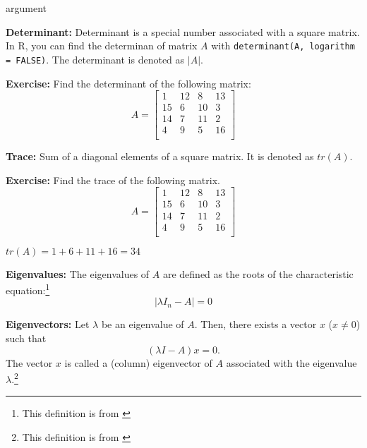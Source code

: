 \begin{labeling}{argument}
    \item[\textbf{Determinant:}] Determinant is a special number associated with a square matrix. In R, you can find the determinan of matrix $A$ with \verb|determinant(A, logarithm = FALSE)|. The determinant is denoted as $|A|$.

    \textbf{Exercise:} Find the determinant of the following matrix:
    \[
        A = \begin{bmatrix}
            1  & 12 & 8  & 13 \\
            15 & 6  & 10 & 3  \\
            14 & 7  & 11 & 2  \\
            4  & 9  & 5  & 16 \\
        \end{bmatrix}
    \]

    \begin{sol}
        
    \end{sol}

    \item[\textbf{Trace:}] Sum of a diagonal elements of a square matrix. It is denoted as $tr(A)$.

    \textbf{Exercise:} Find the trace of the following matrix.
    \[
        A = \begin{bmatrix}
            1  & 12 & 8  & 13 \\
            15 & 6  & 10 & 3  \\
            14 & 7  & 11 & 2  \\
            4  & 9  & 5  & 16 \\
        \end{bmatrix}
    \]

    \begin{sol}
        $tr(A) = 1 + 6 + 11 + 16 = 34$
    \end{sol}

    \item[\textbf{Eigenvalues:}] The eigenvalues of $A$ are defined as the roots of the characteristic equation:\footnote{This definition is from \cite[][page 12]{MagnusNeudecker-2019-part1}}
    \[ |\lambda I_n - A| = 0 \]

    \item[\textbf{Eigenvectors:}] Let $\lambda$ be an eigenvalue of $A$. Then, there exists a vector $x$ ($x \neq 0$) such that
    \[ (\lambda I - A) x = 0. \]
    The vector $x$ is called a (column) eigenvector of $A$ associated with the eigenvalue $\lambda$.\footnote{This definition is from \cite[][page 12]{MagnusNeudecker-2019-part1}}


\end{labeling}
